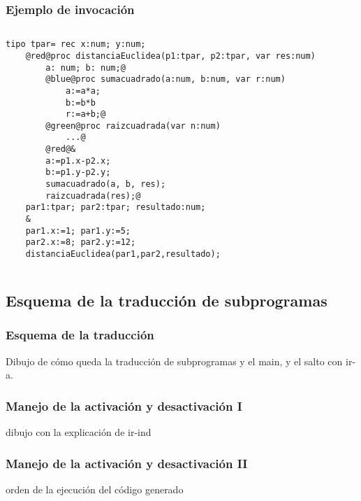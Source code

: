 \documentclass[hyperref={pdfpagelabels=false},tree-dvips]{beamer}
\begin{document}
\begin{frame}[fragile]
\frametitle{Ejemplo de invocación}

\begin{columns}[T]
\begin{lstlisting}[style=codigo]
    tipo tpar= rec x:num; y:num;
    @red@proc distanciaEuclidea(p1:tpar, p2:tpar, var res:num)
        a: num; b: num;@
        @blue@proc sumacuadrado(a:num, b:num, var r:num)
            a:=a*a;
            b:=b*b
            r:=a+b;@
        @green@proc raizcuadrada(var n:num)
            ...@
        @red@&
        a:=p1.x-p2.x;
        b:=p1.y-p2.y;
        sumacuadrado(a, b, res);
        raizcuadrada(res);@
    par1:tpar; par2:tpar; resultado:num;
    &
    par1.x:=1; par1.y:=5;
    par2.x:=8; par2.y:=12;
    distanciaEuclidea(par1,par2,resultado);
\end{lstlisting}
\end{columns}

\end{frame}
\subsection{Esquema de la traducción de subprogramas}
\begin{frame}[fragile]
\frametitle{Esquema de la traducción}

Dibujo de cómo queda la traducción de subprogramas y el main, y el salto con ir-a.

\end{frame}
\begin{frame}[fragile]
\frametitle{Manejo de la activación y desactivación I}

dibujo con la explicación de ir-ind

\end{frame}
\begin{frame}[fragile]
\frametitle{Manejo de la activación y desactivación II}

orden de la ejecución del código generado

\end{frame}
\end{document}
